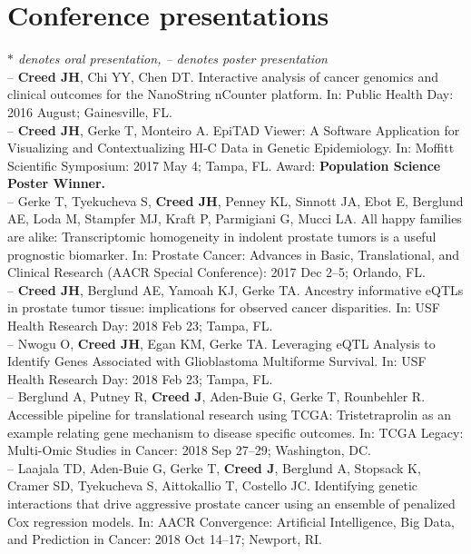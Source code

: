 \documentclass[11pt, a4paper]{article} %
\begin{document}
\section*{Conference presentations}
\vspace{-.3cm}
{\footnotesize\emph{$*$ denotes oral presentation, -- denotes poster presentation}}\\

-- {\bf Creed JH}, Chi YY, Chen DT. Interactive analysis of cancer genomics and clinical outcomes for the NanoString nCounter platform. In: Public Health Day: 2016 August; Gainesville, FL.\\

-- {\bf Creed JH}, Gerke T, Monteiro A. EpiTAD Viewer: A Software Application for Visualizing and Contextualizing HI-C Data in Genetic Epidemiology. In: Moffitt Scientific Symposium: 2017 May 4; Tampa, FL. Award: {\bf Population Science Poster Winner.}\\

-- Gerke T, Tyekucheva S, {\bf Creed JH}, Penney KL, Sinnott JA, Ebot E, Berglund AE, Loda M, Stampfer MJ, Kraft P, Parmigiani G, Mucci LA. All happy families are alike: Transcriptomic homogeneity in indolent prostate tumors is a useful prognostic biomarker. In: Prostate Cancer: Advances in Basic, Translational, and Clinical Research (AACR Special Conference): 2017 Dec 2--5; Orlando, FL. \\

-- {\bf Creed JH}, Berglund AE, Yamoah KJ, Gerke TA. Ancestry informative eQTLs in prostate tumor tissue: implications for observed cancer disparities. In: USF Health Research Day: 2018 Feb 23; Tampa, FL. \\

-- Nwogu O, {\bf Creed JH}, Egan KM, Gerke TA. Leveraging eQTL Analysis to Identify Genes Associated with Glioblastoma Multiforme Survival. In: USF Health Research Day: 2018 Feb 23; Tampa, FL. \\

-- Berglund A, Putney R, {\bf Creed J}, Aden-Buie G, Gerke T, Rounbehler R. Accessible pipeline for translational research using TCGA: Tristetraprolin as an example relating gene mechanism to disease specific outcomes. In: TCGA Legacy: Multi-Omic Studies in Cancer: 2018 Sep 27--29; Washington, DC.\\

-- Laajala TD, Aden-Buie G, Gerke T, {\bf Creed J}, Berglund A, Stopsack K, Cramer SD, Tyekucheva S, Aittokallio T, Costello JC. Identifying genetic interactions that drive aggressive prostate cancer using an ensemble of penalized Cox regression models.  In: AACR Convergence: Artificial Intelligence, Big Data, and Prediction in Cancer: 2018 Oct 14--17; Newport, RI. \\
\end{document}
